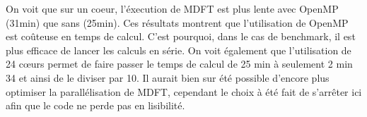 On voit que sur un coeur, l'éxecution de MDFT est plus lente avec OpenMP (31min) que sans (25min). Ces résultats montrent que l'utilisation de OpenMP est co\^uteuse en temps de calcul. C'est pourquoi, dans le cas de benchmark, il est plus efficace de lancer les calculs en série. On voit également que l'utilisation de 24 cœurs permet de faire passer le temps de calcul de 25 min à seulement 2 min 34 et ainsi de le diviser par 10. Il aurait bien sur été possible d'encore plus optimiser la parallélisation de MDFT, cependant le choix à été fait de s’arrêter ici afin que le code ne perde pas en lisibilité.





\clearpage
\strut
\vspace{10\baselineskip}

